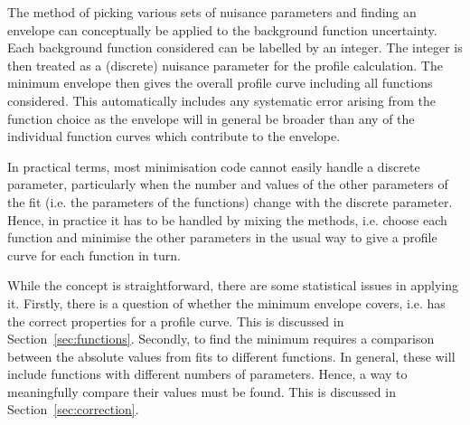 The method of picking various sets of nuisance parameters and finding
an envelope can conceptually be applied to the background function
uncertainty. Each background function considered can be labelled by an
integer. The integer is then treated as a (discrete) nuisance parameter
for the profile calculation.
The minimum envelope then gives the overall profile curve including
all functions considered. This automatically includes any systematic error
arising from the function choice as the envelope will in general be broader
than any of the individual function curves which contribute to the envelope.

In practical terms, most minimisation
code cannot easily handle a discrete parameter, particularly when the
number and values of the other parameters of the fit (i.e. the parameters
of the functions) change with the discrete parameter.
Hence, in practice it has
to be handled by mixing the methods, i.e. choose each function and minimise
the other parameters in the usual way to give a profile curve for each function
in turn. 

While the concept is straightforward, there are some statistical
issues in applying it.
Firstly, there is a question of whether the \nll minimum envelope covers,
i.e. has the correct properties for a profile curve.
This is discussed in Section~\ref{sec:functions}.
Secondly, to find the minimum requires a
comparison between the absolute \nll values from fits to different functions.
In general, these will include functions with different numbers of parameters.
Hence, a way to meaningfully compare their \nll values must be found.
This is discussed in Section~\ref{sec:correction}.
